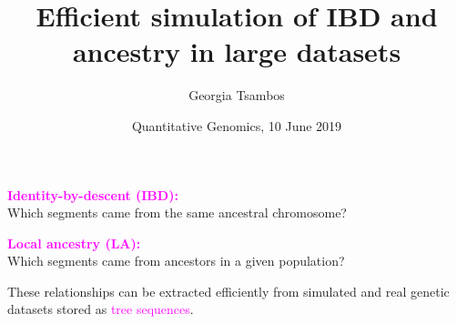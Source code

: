 \documentclass[11pt, mathserif, aspectratio=169]{beamer}
\title{Efficient simulation of IBD and ancestry in large datasets}
\author{Georgia Tsambos}
\institute{{\normalsize University of Melbourne, Australia}}
\date{Quantitative Genomics, 10 June 2019}
\newcommand{\magenta}[1]{\textcolor{magenta}{#1}}
\begin{document}

\begin{frame}
\begin{center}
\begin{minipage}{.45\linewidth}
\flushleft

\end{minipage}\hspace{1cm}\begin{minipage}{.45\linewidth}
\flushright
{\bf\magenta{Identity-by-descent (IBD):}}\\
Which segments came from the same ancestral chromosome?
\vspace{15mm}

{\bf\magenta{Local ancestry (LA):}}\\
Which segments came from ancestors in a given population?
\end{minipage}
\vspace{5mm}
\flushleft
These relationships can be extracted efficiently from simulated and real genetic datasets stored as \magenta{tree sequences}.
\end{center}
\end{frame}
\end{document}
